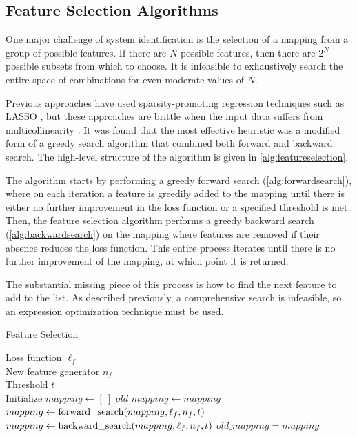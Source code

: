 \documentclass{article}
\begin{document}
\subsection{Feature Selection Algorithms}

One major challenge of system identification is the selection of a mapping from a group of possible features. If there are $N$ possible features, then there are $2^N$ possible subsets from which to choose. It is infeasible to exhaustively search the entire space of combinations for even moderate values of $N$.

Previous approaches have used sparsity-promoting regression techniques such as LASSO \cite{tibshirani1996regression}, but these approaches are brittle when the input data suffers from multicollinearity \cite{rudy2017data}. It was found that the most effective heuristic was a modified form of a greedy search algorithm that combined both forward and backward search. The high-level structure of the algorithm is given in \cref{alg:featureselection}.

The algorithm starts by performing a greedy forward search (\cref{alg:forwardsearch}), where on each iteration a feature is greedily added to the mapping until there is either no further improvement in the loss function or a specified threshold is met. Then, the feature selection algorithm performs a greedy backward search (\cref{alg:backwardsearch}) on the mapping where features are removed if their absence reduces the loss function. This entire process iterates until there is no further improvement of the mapping, at which point it is returned.

The substantial missing piece of this process is how to find the next feature to add to the list. As described previously, a comprehensive search is infeasible, so an expression optimization technique must be used.


\begin{algorithm}[tb]
   \caption{Feature Selection}
   \label{alg:featureselection}
\begin{algorithmic}
    Loss function $\ell_f$ \\
   \quad \quad \quad New feature generator $n_f$ \\
   \quad \quad \quad Threshold $t$ \\
   \STATE Initialize $mapping \gets [ \ ]$
   \REPEAT
   \STATE $old\_mapping \gets mapping$
   \STATE $mapping \gets {\rm forward\_search}(mapping, \ell_f, n_f, t)$
   \STATE $mapping \gets {\rm backward\_search}(mapping, \ell_f, n_f, t)$
   \UNTIL $old\_mapping = mapping$
\end{algorithmic}
\end{algorithm}
\end{document}
